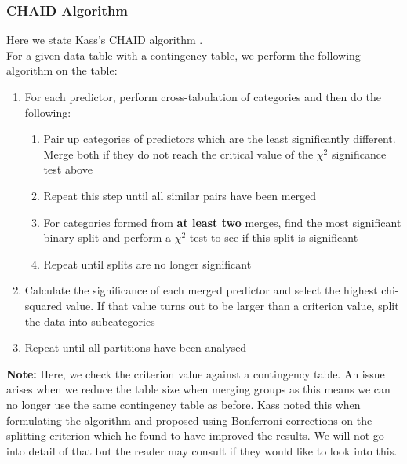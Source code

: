 \documentclass[11pt,a4paper]{report}
\begin{document}
\subsubsection{CHAID Algorithm}
Here we state Kass's CHAID algorithm \cite[pp. 121]{CHAID}.\\
For a given data table with a contingency table, we perform the following algorithm on the table:
\begin{enumerate}
    \item For each predictor, perform cross-tabulation of categories and then do the following:
    \begin{enumerate}
        \item Pair up categories of predictors which are the least significantly different. Merge both if they do not reach the critical value of the $\chi^{2}$ significance test above
        
        \item Repeat this step until all similar pairs have been merged
        
        \item For categories formed from \textbf{at least two} merges, find the most significant binary split and perform a $\chi^{2}$ test to see if this split is significant
        
        \item Repeat until splits are no longer significant
    \end{enumerate}
    
    \item Calculate the significance of each merged predictor and select the highest chi-squared value. If that value turns out to be larger than a criterion value, split the data into subcategories
    
    \item Repeat until all partitions have been analysed
\end{enumerate}
\textbf{Note:} Here, we check the criterion value against a contingency table.
An issue arises when we reduce the table size when merging groups as this means we can no longer use the same contingency table as before.
Kass noted this when formulating the algorithm and proposed using Bonferroni corrections on the splitting criterion which he found to have improved the results. 
We will not go into detail of that but the reader may consult \cite[pp. 122-126]{CHAID} if they would like to look into this.
\end{document}
